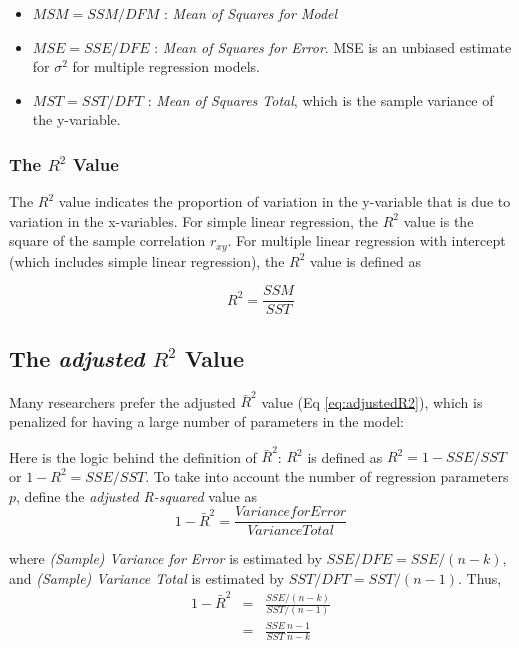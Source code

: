\begin{itemize}
  \item $MSM = SSM / DFM$ : \emph{Mean of Squares for Model}
  \item $MSE = SSE / DFE$ : \emph{Mean of Squares for Error}. MSE is an unbiased estimate for $\sigma^2$ for multiple regression models.
  \item $MST = SST / DFT$ : \emph{Mean of Squares Total}, which is the sample variance of the y-variable.
\end{itemize}

\subsubsection{The $R^2$ Value}

The $R^2$ value indicates the proportion of variation in the y-variable that is due to variation in the x-variables. For simple linear regression, the $R^2$ value is the square of the sample correlation $r_{xy}$. For multiple linear regression with intercept (which includes simple linear regression), the $R^2$ value is defined as

\begin{equation}
  R^2 = \frac{SSM}{SST}
\end{equation}

\subsection{The \emph{adjusted} $R^2$ Value}

Many researchers prefer the adjusted $\bar{R}^2$ value (Eq \ref{eq:adjustedR2}), which is penalized for having a large number of parameters in the model:

Here is the logic behind the definition of $\bar{R}^2$:
$R^2$ is defined as $R^2 = 1 - SSE/SST$ or $1 - R^2 = SSE/SST$. To take into account the number of regression parameters $p$, define the \emph{adjusted R-squared} value as
\begin{equation}
  1- \bar{R}^2 = \frac{Variance for Error}{Variance Total}
\end{equation}

where \emph{(Sample) Variance for Error} is estimated by $SSE/DFE = SSE/(n-k)$, and \emph{(Sample) Variance Total} is estimated by $SST/DFT = SST/(n-1)$. Thus,
\begin{eqnarray}
    1 - \bar{R}^2 &=& \frac{SSE/(n - k)}{SST/(n - 1)} \\
          	&=& \frac{SSE}{SST}\frac{n - 1}{n - k}
\end{eqnarray}

